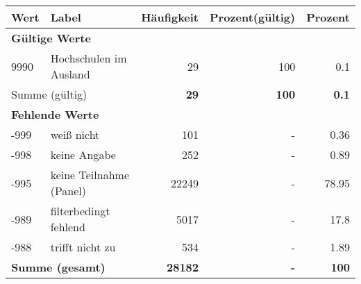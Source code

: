      \begin{longtable}{lXrrr}
     \toprule
     \textbf{Wert} & \textbf{Label} & \textbf{Häufigkeit} & \textbf{Prozent(gültig)} & \textbf{Prozent} \\
     \endhead
     \midrule
     \multicolumn{5}{l}{\textbf{Gültige Werte}}\\

     9990 &
     \multicolumn{1}{X}{ Hochschulen im Ausland   } &


       \num{29} &
       \num[round-mode=places,round-precision=2]{100} &
         \num[round-mode=places,round-precision=2]{0.1} \\
     \midrule
     \multicolumn{2}{l}{Summe (gültig)} &
       \textbf{\num{29}} &
     \textbf{100} &
       \textbf{\num[round-mode=places,round-precision=2]{0.1}} \\
     \multicolumn{5}{l}{\textbf{Fehlende Werte}}\\
       -999 &
       weiß nicht &
         \num{101} &
        - &
         \num[round-mode=places,round-precision=2]{0.36} \\
       -998 &
       keine Angabe &
         \num{252} &
        - &
         \num[round-mode=places,round-precision=2]{0.89} \\
       -995 &
       keine Teilnahme (Panel) &
         \num{22249} &
        - &
         \num[round-mode=places,round-precision=2]{78.95} \\
       -989 &
       filterbedingt fehlend &
         \num{5017} &
        - &
         \num[round-mode=places,round-precision=2]{17.8} \\
       -988 &
       trifft nicht zu &
         \num{534} &
        - &
         \num[round-mode=places,round-precision=2]{1.89} \\
     \midrule
     \multicolumn{2}{l}{\textbf{Summe (gesamt)}} &
          \textbf{\num{28182}} &
        \textbf{-} &
        \textbf{100} \\
     \bottomrule
     \end{longtable}
     
